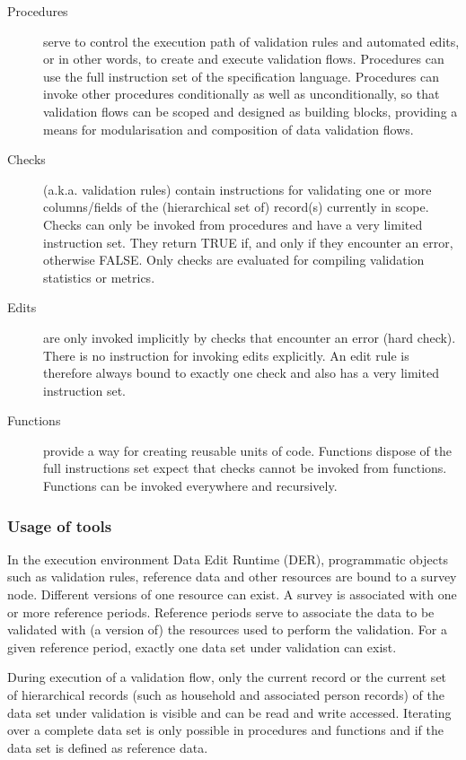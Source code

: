 \begin{description}

\item[Procedures] serve to control the execution path of validation rules and automated edits, or in other words, to create and execute validation flows. Procedures can use the full instruction set of the specification language. Procedures can invoke other procedures conditionally as well as unconditionally, so that validation flows can be scoped and designed as building blocks, providing a means for modularisation and composition of data validation flows.

\item[Checks](a.k.a. validation rules) contain instructions for validating one or more columns/fields of the (hierarchical set of) record(s) currently in scope. Checks can only be invoked from procedures and have a very limited instruction set. They return TRUE if, and only if they encounter an error, otherwise FALSE. Only checks are evaluated for compiling validation statistics or metrics.

\item[Edits] are only invoked implicitly by checks that encounter an error (hard check). There is no instruction for invoking edits explicitly. An edit rule is therefore always bound to exactly one check and also has a very limited instruction set.

\item[Functions] provide a way for creating reusable units of code. Functions dispose of the full instructions set expect that checks cannot be invoked from functions. Functions can be invoked everywhere and recursively.

\end{description}

\subsubsection{Usage of tools}

In the execution environment Data Edit Runtime (DER), programmatic objects such as validation rules, reference data and other resources are bound to a survey node. Different versions of one resource can exist. A survey is associated with one or more reference periods. Reference periods serve to associate the data to be validated with (a version of) the resources used to perform the validation. For a given reference period, exactly one data set under validation can exist.

During execution of a validation flow, only the current record or the current set of hierarchical records (such as household and associated person records) of the data set under validation is visible and can be read and write accessed. Iterating over a complete data set is only possible in procedures and functions and if the data set is defined as reference data.

